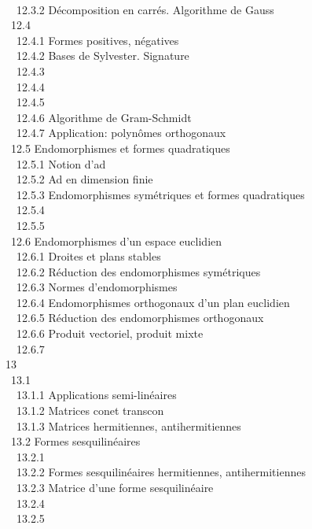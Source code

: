 \documentclass[]{article}
\begin{document}
\\ ~~12.3.2 {Décomposition en
carrés. Algorithme de Gauss} \\ ~12.4
 \\
~~12.4.1 {Formes positives,
négatives} \\ ~~12.4.2 {Bases de
Sylvester. Signature} \\ ~~12.4.3
 \\ ~~12.4.4
 \\
~~12.4.5  \\
~~12.4.6 {Algorithme de
Gram-Schmidt} \\ ~~12.4.7
{Application: polynômes
orthogonaux} \\ ~12.5
{Endomorphismes et formes
quadratiques} \\ ~~12.5.1 {Notion
d'ad\jmathoint} \\ ~~12.5.2 {Ad\jmathoint
en dimension finie} \\ ~~12.5.3
{Endomorphismes symétriques et
formes quadratiques} \\ ~~12.5.4
 \\ ~~12.5.5
 \\ ~12.6
{Endomorphismes d'un espace
euclidien} \\ ~~12.6.1 {Droites
et plans stables} \\ ~~12.6.2
{Réduction des endomorphismes
symétriques} \\ ~~12.6.3 {Normes
d'endomorphismes} \\ ~~12.6.4
{Endomorphismes orthogonaux d'un
plan euclidien} \\ ~~12.6.5
{Réduction des endomorphismes
orthogonaux} \\ ~~12.6.6 {Produit
vectoriel, produit mixte} \\ ~~12.6.7
 \\ 13
 \\ ~13.1
 \\
~~13.1.1 {Applications
semi-linéaires} \\ ~~13.1.2
{Matrices con et
transcon} \\ ~~13.1.3
{Matrices hermitiennes,
antihermitiennes} \\ ~13.2 {Formes
sesquilinéaires} \\ ~~13.2.1
 \\ ~~13.2.2
{Formes sesquilinéaires
hermitiennes, antihermitiennes} \\ ~~13.2.3
{Matrice d'une forme
sesquilinéaire} \\ ~~13.2.4
 \\
~~13.2.5  \\
\end{document}
